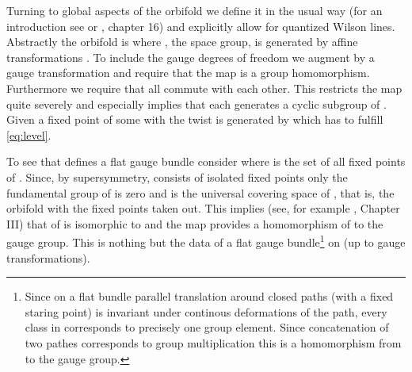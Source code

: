 \documentclass[a4paper,12pt,twoside]{article}
\numberwithin{equation}{section}
\providecommand{\pE}{\text{E}  }     %
\providecommand{\mC}{\mathbb{C}}
\providecommand{\auf}{\rightarrow}
\begin{document}
Turning to global aspects of the orbifold we define it in the usual
way \cite{OrbII} (for an introduction see \cite{Nilles} or \cite{Pol},
chapter 16) and explicitly allow for quantized Wilson lines.
Abstractly the orbifold is \myHighlight{$O = \mC^2/S$}\coordHE{} where \coordHE{}, the space group,
is generated by affine transformations \coordHE{}.  To
include the gauge degrees of freedom we augment \coordHE{} by a gauge
transformation \coordHE{} and require that the map \myHighlight{$\gamma : S \auf
\pE_8 \times \pE_8$}\coordHE{} is a group homomorphism. Furthermore we require
that all \coordHE{} commute with each other. This restricts the map
\myHighlight{$\gamma$}\coordHE{} quite severely and especially implies that each \coordHE{}
generates a cyclic subgroup of \myHighlight{$\pE_8$}\coordHE{}. Given a fixed point \coordHE{} of some \coordHE{} with \coordHE{} the twist is generated by \coordHE{} which has to fulfill \eqref{eq:level}.

To see that \myHighlight{$\gamma$}\coordHE{} defines a flat gauge bundle consider
\myHighlight{$\mC^2-F$}\coordHE{} where \coordHE{} is the set of all fixed points of \coordHE{}.  Since, by
supersymmetry, \coordHE{} consists of isolated fixed points only the
fundamental group \coordHE{} of \myHighlight{$\mC^2-F$}\coordHE{} is zero and \myHighlight{$\mC^2-F$}\coordHE{} is the
universal covering space of \myHighlight{$(\mC^2-F)/S = O-F$}\coordHE{}, that is, the orbifold
with the fixed points taken out. This implies (see, for example
\cite{Bredon}, Chapter III) that \coordHE{} of \coordHE{} is isomorphic to \coordHE{}
and the map \myHighlight{$\gamma$}\coordHE{} provides a homomorphism of \coordHE{} to the
gauge group.  This is nothing but the data of a flat gauge
bundle\footnote{%
  Since on a flat bundle parallel translation around closed paths
  (with a fixed staring point) is invariant under continous
  deformations of the path, every class in \coordHE{} corresponds to
  precisely one group element. Since concatenation of two pathes
  corresponds to group multiplication this is a homomorphism from
  \coordHE{} to the gauge group.} on \coordHE{} (up to gauge transformations).
\end{document}
